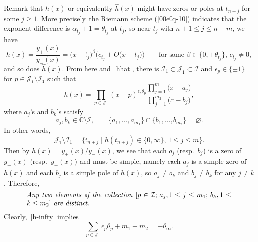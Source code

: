 \documentclass[10pt,a4paper]{amsart}
\numberwithin{equation}{section}
\begin{document}
Remark that $h(x)$ or equivalently $\hat{h}(x)$ might have zeros or
poles at $t_{n+j}$ for some $j\geq 1$. More precisely, the Riemann
scheme (\ref{00e0q-10}) indicates that the exponent difference is
$\alpha_{t_j}+1=\theta_{t_j}$ at $t_j$, so near $t_j$ with $n+1\leq
j\leq n+m$, we have
\[h(x)=\frac{y_{+}(x)}{y_{-}(x)}=\bigl(x-t_j\bigr)^{\beta}\bigl(c_{t_j}+O\bigl(x-t_j\bigr)\bigr) \qquad \text{for some $\beta\in\bigl\{0,\pm \theta_{t_j}\bigr\}$, $c_{t_j}\neq 0$},\]
and so does $\hat{h}(x)$. From here and~\eqref{hhat}, there is $\mathcal{I}_1\subset \mathcal{J}_1\subset \mathcal{I}$ and $\epsilon_p\in \{\pm 1\}$ for $p\in \mathcal{J}_1\setminus\mathcal{I}_1$ such that
\begin{equation}\label{00e0q-9}
h(x)=\prod_{p\in \mathcal{J}_1}(x-p)^{\epsilon_{p}\theta_{p}}
\frac{\prod_{j=1}^{m_1}\bigl(x-a_j\bigr)}{\prod_{j=1}^{m_2}\bigl(x-b_j\bigr)},
\end{equation}
where $a_j$'s and $b_k$'s satisfy
\begin{equation*}%
 a_j, b_k\in\mathbb{C}\setminus\mathcal{I},\qquad
 \{a_1,\dots, a_{m_1}\}\cap\{b_1,\dots, b_{m_2}\}=\varnothing.
\end{equation*}
In other words,
\[\mathcal{J}_1\setminus\mathcal{I}_1=\{t_{n+j}\mid h(t_{n+j})\in\{0,\infty\},\, 1\leq j\leq m\}.\]
Then by $h(x)=y_{+}(x)/y_{-}(x)$, we see that each $a_j$ (resp.\ $b_j$)
is a zero of $y_+(x)$ (resp.\ $y_-(x)$) and must be simple, namely each
$a_j$ is a simple zero of $h(x)$ and each $b_j$ is a simple pole of
$h(x)$, so $a_j\neq a_k$ and $b_j\neq b_k$ for any $j\neq
k$. Therefore,
\begin{equation*} %
 \parbox{\dimexpr\linewidth-5em}{\it
 Any two elements of the collection $[p\in\mathcal{I};\, a_j, 1\leq j\leq m_1;\, b_k, 1\leq k\leq m_2]$ are distinct. %
}
\end{equation*}
Clearly,~\eqref{h-infty} implies
\begin{equation}\label{00e0q-10-copy}\sum_{p\in \mathcal{J}_1}\epsilon_{p}\theta_{p}+m_1-m_2=-\theta_\infty.\end{equation}
\end{document}
